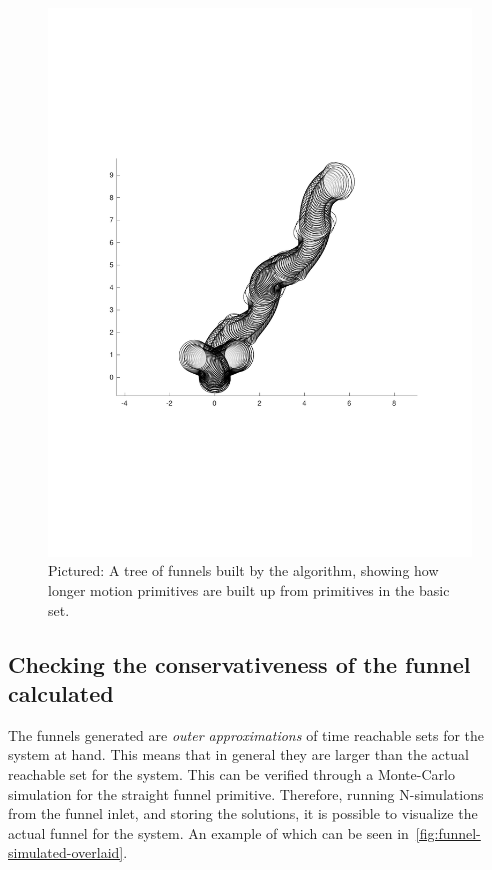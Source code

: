\begin{figure}
  \centering \includegraphics[scale=.5]{figures/method/funnel-tree}
  \caption{Pictured: A tree of funnels built by the \rrtfunnel{} algorithm,
    showing how longer motion primitives are built up from primitives in the
    basic set.}
  \label{fig:funnel-composition-tree}
\end{figure}

\subsection{Checking the conservativeness of the funnel calculated}

The funnels generated are \textit{outer approximations} of time reachable sets
for the system at hand. This means that in general they are larger than the
actual reachable set for the system. This can be verified through a Monte-Carlo
simulation for the straight funnel primitive. Therefore, running N-simulations
from the funnel inlet, and storing the solutions, it is possible to visualize
the actual funnel for the system. An example of which can be seen
in~\cref{fig:funnel-simulated-overlaid}.


